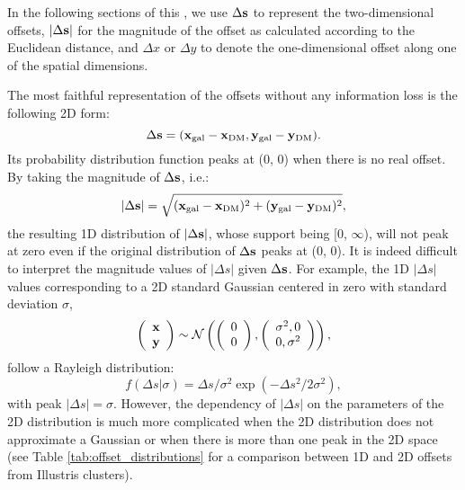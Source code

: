 \documentclass[usenatbib]{mn2e}
\begin{document}
{In the following sections of this , 
we use $\Delta {\bf s}$  to represent the
two-dimensional offsets, $|\Delta {\bf s}|$ for the magnitude of the offset as calculated
according to the Euclidean distance, and $\Delta x$ or $\Delta y$ to denote the
one-dimensional offset along one of the spatial dimensions.

The most faithful representation of the offsets without any information loss
is the following 2D form:
\begin{equation}
	\Delta {\bf s} = ({\bf x}_{\rm gal} - {\bf x}_{\rm DM}, 
	{\bf y}_{\rm gal} - {\bf y}_{\rm DM} ).
	\label{eq:2D_offsets}
\end{equation}
Its probability distribution function peaks at (0, 0) when there is no real offset. By taking the magnitude of $\Delta {\bf s}$, i.e.:
\begin{equation}
	|\Delta {\bf s}| = \sqrt{({\bf x}_{\rm gal} - {\bf x}_{\rm DM})^2 + 
	({\bf y}_{\rm gal} - {\bf y}_{\rm DM})^2},
	\label{eq:magnitude_offsets}
\end{equation}
the resulting 1D distribution of $|\Delta {\bf s}|$, 
whose support being [0, $\infty$),
will not peak at zero even if the original
distribution of $\Delta {\bf s}$ peaks at (0, 0). It is indeed difficult to interpret the magnitude values of $|\Delta
s|$ given $\Delta {\bf s}$. For example,  the 1D $|\Delta s|$ values corresponding to a 2D standard Gaussian centered in zero with standard deviation $\sigma$,
\begin{equation}
	\left(\begin{array}{c}
			\bf{x}\\
			\bf{y}
		\end{array}
	\right) \sim \mathcal{N}\left(
	\left(
		\begin{array}{c}
			0 \\
			0
		\end{array}
	\right),
	\left(\begin{array}{cc}
		\sigma^2, 0 \\
		0, \sigma^2
	 \end{array}
	\right)
\right),
\end{equation}
follow a Rayleigh distribution:
\begin{equation}
	f(\Delta s | \sigma) = \Delta s /  \sigma^2 \exp(-\Delta s^2 / 2 \sigma^2),
	\label{eq:rayleigh_distro}
\end{equation}
with peak $|\Delta s| = \sigma$.
However, the dependency of $|\Delta s|$ on the parameters of
the 2D distribution is much more complicated when the 2D distribution does not approximate a Gaussian 
or when there is more than one peak in the 2D space (see Table \ref{tab:offset_distributions} for a comparison between 1D and 2D offsets from Illustris clusters).

}
\end{document}
